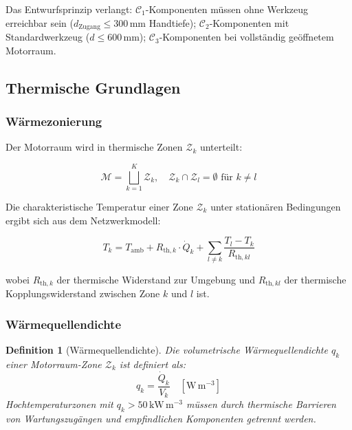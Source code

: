 ﻿\documentclass[12pt,a4paper]{article}
\newtheorem{definition}{Definition}[section]
\begin{document}
Das Entwurfsprinzip verlangt: $\mathcal{C}_1$-Komponenten müssen ohne Werkzeug
erreichbar sein ($d_\mathrm{Zugang} \leq 300\,\mathrm{mm}$ Handtiefe);
$\mathcal{C}_2$-Komponenten mit Standardwerkzeug ($d \leq 600\,\mathrm{mm}$);
$\mathcal{C}_3$-Komponenten bei vollständig geöffnetem Motorraum.

\subsection{Thermische Grundlagen}

\subsubsection{Wärmezonierung}

Der Motorraum wird in thermische Zonen $\mathcal{Z}_k$ unterteilt:

\begin{equation}
	\mathcal{M} = \bigsqcup_{k=1}^{K} \mathcal{Z}_k, \quad
	\mathcal{Z}_k \cap \mathcal{Z}_l = \emptyset \text{ für } k \neq l
	\label{eq:zonenzerlegung}
\end{equation}

Die charakteristische Temperatur einer Zone $\mathcal{Z}_k$ unter stationären
Bedingungen ergibt sich aus dem Netzwerkmodell:

\begin{equation}
	T_k = T_\mathrm{amb} + R_{\mathrm{th},k} \cdot \dot{Q}_k
	+ \sum_{l \neq k} \frac{T_l - T_k}{R_{\mathrm{th},kl}}
	\label{eq:zonen_temp}
\end{equation}

wobei $R_{\mathrm{th},k}$ der thermische Widerstand zur Umgebung und
$R_{\mathrm{th},kl}$ der thermische Kopplungswiderstand zwischen Zone $k$
und $l$ ist.

\subsubsection{Wärmequellendichte}

\begin{definition}[Wärmequellendichte]
	Die volumetrische Wärmequellendichte $q_k$ einer Motorraum-Zone $\mathcal{Z}_k$
	ist definiert als:
	\begin{equation}
		q_k = \frac{\dot{Q}_k}{V_k} \quad [\mathrm{W\,m^{-3}}]
		\label{eq:waermequelldichte}
	\end{equation}
	Hochtemperaturzonen mit $q_k > 50\,\mathrm{kW\,m^{-3}}$ müssen durch
	thermische Barrieren von Wartungszugängen und empfindlichen Komponenten
	getrennt werden.
\end{definition}
\end{document}
